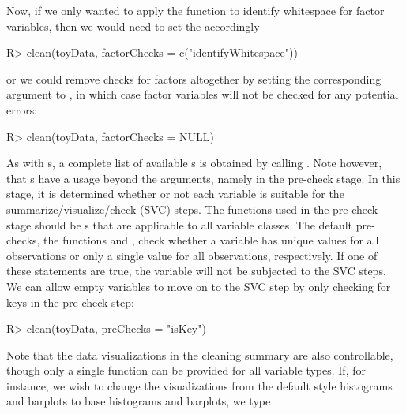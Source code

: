 \documentclass[article,shortnames]{jss}
\begin{document}
Now, if we only wanted to apply the function to identify whitespace
for factor variables, then we would need to set the
 accordingly

\begin{Schunk}
\begin{Sinput}
R> clean(toyData, factorChecks = c("identifyWhitespace"))
\end{Sinput}
\end{Schunk}

or we could remove checks for factors altogether by setting the
corresponding argument to , in which case factor variables will
not be checked for any potential errors:

\begin{Schunk}
\begin{Sinput}
R> clean(toyData, factorChecks = NULL)
\end{Sinput}
\end{Schunk}

As with s, a complete list of available
s is obtained by calling
. Note however, that s have a
usage beyond the  arguments, namely in the
pre-check stage. In this stage, it is determined whether or
not each variable is suitable for the summarize/visualize/check (SVC)
steps. The functions used in the pre-check stage should be
s that are applicable to all variable classes. The
default pre-checks, the functions  and , check
whether a variable has unique values for all observations or only a
single value for all observations, respectively. If one of these
statements are true, the variable will not be subjected to the SVC
steps.  We can allow empty variables to move on to the SVC step by
only checking for keys in the pre-check step:

\begin{Schunk}
\begin{Sinput}
R> clean(toyData, preChecks = "isKey")
\end{Sinput}
\end{Schunk}

Note that the data visualizations in the cleaning summary are also
controllable, though only a single function can be provided for all
variable types. If, for instance, we wish to change the visualizations
from the default  \citep{ggplot2} style histograms and barplots to base
 histograms and barplots, we type
\end{document}

